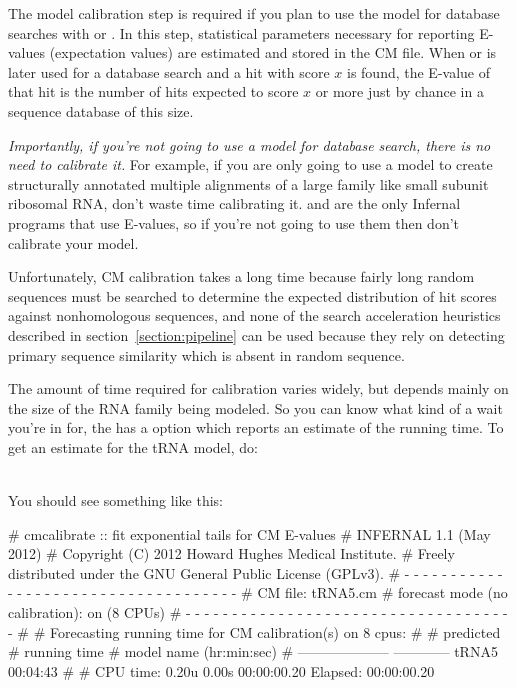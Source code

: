 The model calibration step is required if you plan to use the model
for database searches with  or . In this
step, statistical parameters necessary for reporting E-values
(expectation values) are estimated and stored in the CM file.  When
 or  is later used for a database search
and a hit with score $x$ is found, the E-value of that hit is the
number of hits expected to score $x$ or more just by chance in a
sequence database of this size. 

\emph{Importantly, if you're not going to use a model for database
search, there is no need to calibrate it.} For example, if you are
only going to use a model to create structurally annotated multiple
alignments of a large family like small subunit ribosomal RNA, don't
waste time calibrating it.  and  are the
only Infernal programs that use E-values, so if you're not going to
use them then don't calibrate your model.

Unfortunately, CM calibration takes a long time because fairly long
random sequences must be searched to determine the expected
distribution of hit scores against nonhomologous sequences, and none
of the search acceleration heuristics described in
section~\ref{section:pipeline} can be used because they rely on
detecting primary sequence similarity which is absent in random
sequence. 

The amount of time required for calibration varies widely, but
depends mainly on the size of the RNA family being modeled.
So you can know what kind of a wait you're in for, the
 has a  option which reports an
estimate of the running time. To get an estimate for the tRNA model, do:

\\

You should see something like this:

\begin{sreoutput}
# cmcalibrate :: fit exponential tails for CM E-values
# INFERNAL 1.1 (May 2012)
# Copyright (C) 2012 Howard Hughes Medical Institute.
# Freely distributed under the GNU General Public License (GPLv3).
# - - - - - - - - - - - - - - - - - - - - - - - - - - - - - - - - - - - -
# CM file:                                     tRNA5.cm
# forecast mode (no calibration):              on (8 CPUs)
# - - - - - - - - - - - - - - - - - - - - - - - - - - - - - - - - - - - -
#
# Forecasting running time for CM calibration(s) on 8 cpus:
#
#                          predicted
#                       running time
# model name            (hr:min:sec)
# --------------------  ------------
  tRNA5                     00:04:43
#
# CPU time: 0.20u 0.00s 00:00:00.20 Elapsed: 00:00:00.20
\end{sreoutput}

